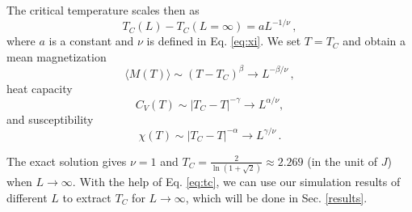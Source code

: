 The critical temperature scales then as
\begin{equation}
T_C(L)-T_C(L=\infty) = aL^{-1/\nu}\,,
\label{eq:tc}
\end{equation}
where $a$ is a constant and $\nu$ is defined in Eq. \ref{eq:xi}. 
We set $T=T_C$ and obtain a mean magnetization
\begin{equation}
\langle M(T) \rangle \sim \left(T-T_C\right)^{\beta}
\rightarrow L^{-\beta/\nu}\,,
\label{eq:scale1}
\end{equation}
heat capacity
\begin{equation}
C_V(T) \sim \left|T_C-T\right|^{-\gamma} \rightarrow L^{\alpha/\nu},
\label{eq:scale2}
\end{equation}
and susceptibility
\begin{equation}
\chi(T) \sim \left|T_C-T\right|^{-\alpha} \rightarrow L^{\gamma/\nu}\,.
\label{eq:scale3}
\end{equation}
\par
The exact solution gives $\nu=1$ and $T_C=\frac{2}{\ln\left(1+\sqrt{2}\right)}\approx 2.269$ 
(in the unit of $J$) when $L\rightarrow\infty$. 
With the help of Eq. \ref{eq:tc}, we can use our simulation results of different $L$ to extract $T_C$ for $L\rightarrow\infty$, 
which will be done in Sec. \ref{results}. 
